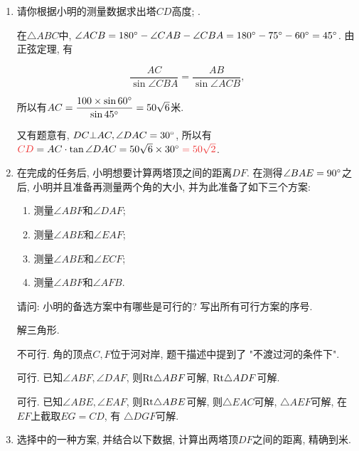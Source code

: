 \documentclass[8pt]{article}
\begin{document}
		\begin{enumerate}[label = \calword{(\arabic*)}]
			\item 请你根据小明的测量数据求出塔\(CD\)高度; .

				 在\(\triangle ABC\)中, \(\angle ACB = 180^\circ - \angle CAB - \angle CBA = 180^\circ - 75^\circ - 60^\circ = 45^\circ\). 由正弦定理, 有

				\[
					\frac{AC}{\sin \angle CBA} = \frac{AB}{\sin \angle ACB},
				\]

				所以有\(AC = \dfrac{100 \times \sin 60^\circ}{\sin 45^\circ} = 50 \sqrt{6}\)米.

				又有题意有, \(DC \bot AC, \angle DAC = 30^\circ\), 所以有\(\ansmath{CD} = AC \cdot \tan \angle DAC = 50 \sqrt{6} \times 30\degree \ansmath{= 50\sqrt{2}}\).

			\item 在完成的任务后, 小明想要计算两塔顶之间的距离\(DF\). 在测得\(\angle BAE = 90^\circ\)之后, 小明并且准备再测量两个角的大小, 并为此准备了如下三个方案:

				\begin{multicols}{2}
					\begin{enumerate}[label = \calword{方案\arabic*.}]
						\item 测量\(\angle ABF\)和\(\angle DAF\);
						\item 测量\(\angle ABE\)和\(\angle EAF\);
						\item 测量\(\angle ABE\)和\(\angle ECF\);
						\item 测量\(\angle ABF\)和\(\angle AFB\).
					\end{enumerate}
				\end{multicols}

				请问: 小明的备选方案中有哪些是可行的? 写出所有可行方案的序号. 

				 解三角形.

				 不可行. 角的顶点\(C, F\)位于河对岸, 题干描述中提到了 "不渡过河的条件下".

				 可行. 已知\(\angle ABF, \angle DAF\), 则\(\mathrm{Rt} \triangle ABF\)可解, \(\mathrm{Rt} \triangle ADF\)可解.

				 可行. 已知\(\angle ABE, \angle EAF\), 则\(\mathrm{Rt} \triangle ABE\)可解, 则\(\triangle EAC\)可解, \(\triangle AEF\)可解, 在\(EF\)上截取\(EG=CD\), 有 \(\triangle DGF\)可解.

			\item 选择中的一种方案, 并结合以下数据, 计算出两塔顶\(DF\)之间的距离, 精确到米.


\end{enumerate}
\end{document}
